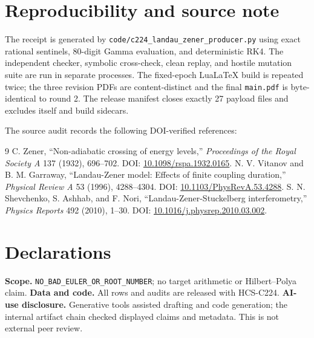\documentclass[10pt]{article}
\begin{document}
\clearpage
\section*{Reproducibility and source note}

The receipt is generated by
\texttt{code/c224\_landau\_zener\_producer.py} using exact rational sentinels,
80-digit Gamma evaluation, and deterministic RK4.  The independent checker,
symbolic cross-check, clean replay, and hostile mutation suite are run in
separate processes.  The fixed-epoch LuaLaTeX build is repeated twice; the
three revision PDFs are content-distinct and the final \texttt{main.pdf} is
byte-identical to round 2.  The release manifest closes exactly 27 payload
files and excludes itself and build sidecars.

The source audit records the following DOI-verified references:

\begin{thebibliography}{9}
 C. Zener, ``Non-adiabatic crossing of energy levels,''
\emph{Proceedings of the Royal Society A} 137 (1932), 696--702.
DOI: \href{https://doi.org/10.1098/rspa.1932.0165}{10.1098/rspa.1932.0165}.
 N. V. Vitanov and B. M. Garraway, ``Landau-Zener model:
Effects of finite coupling duration,'' \emph{Physical Review A} 53 (1996),
4288--4304. DOI: \href{https://doi.org/10.1103/PhysRevA.53.4288}{10.1103/PhysRevA.53.4288}.
 S. N. Shevchenko, S. Ashhab, and F. Nori,
``Landau-Zener-Stuckelberg interferometry,'' \emph{Physics Reports} 492
(2010), 1--30. DOI: \href{https://doi.org/10.1016/j.physrep.2010.03.002}{10.1016/j.physrep.2010.03.002}.
\end{thebibliography}

\section*{Declarations}
\textbf{Scope.} \texttt{NO\_BAD\_EULER\_OR\_ROOT\_NUMBER}; no target
arithmetic or Hilbert--Polya claim.  \textbf{Data and code.} All rows and
audits are released with HCS-C224.  \textbf{AI-use disclosure.} Generative
tools assisted drafting and code generation; the internal artifact chain
checked displayed claims and metadata.  This is not external peer review.
\end{document}

